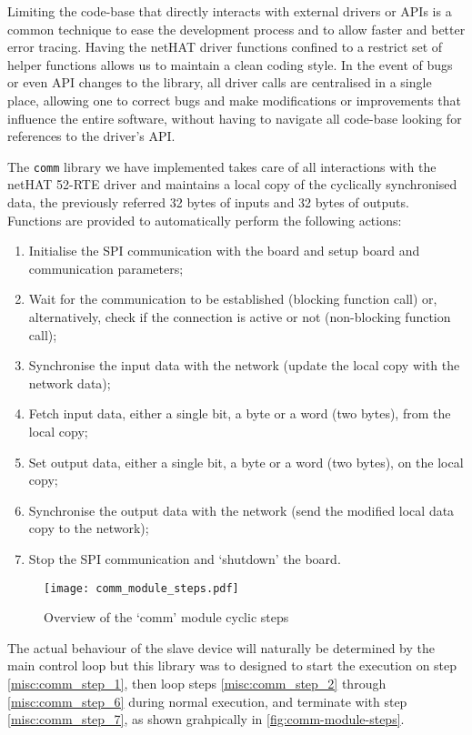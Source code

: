 Limiting the code-base that directly interacts with external drivers or APIs is a common technique to ease the development process and to allow faster and better error tracing.
Having the netHAT driver functions confined to a restrict set of helper functions allows us to maintain a clean coding style.
In the event of bugs or even API changes to the library, all driver calls are centralised in a single place, allowing one to correct bugs and make modifications or improvements that influence the entire software, without having to navigate all code-base looking for references to the driver's API.

The \verb|comm| library we have implemented takes care of all interactions with the netHAT 52-RTE driver and maintains a local copy of the cyclically synchronised data, the previously referred 32 bytes of inputs and 32 bytes of outputs.
Functions are provided to automatically perform the following actions:

\begin{enumerate}
	\item Initialise the SPI communication with the board and setup board and communication parameters; \label{misc:comm_step_1}
	\item Wait for the communication to be established (blocking function call) or, alternatively, check if the connection is active or not (non-blocking function call); \label{misc:comm_step_2}
	\item Synchronise the input data with the network (update the local copy with the network data);
	\item Fetch input data, either a single bit, a byte or a word (two bytes), from the local copy;
	\item Set output data, either a single bit, a byte or a word (two bytes), on the local copy;
	\item Synchronise the output data with the network (send the modified local data copy to the network); \label{misc:comm_step_6}
	\item Stop the SPI communication and `shutdown' the board. \label{misc:comm_step_7}
\end{enumerate}

\begin{figure}[htp]
	\centering
	\texttt{[image: comm\_module\_steps.pdf]}
	\caption{Overview of the `comm' module cyclic steps}
	\label{fig:comm-module-steps}
\end{figure}

The actual behaviour of the slave device will naturally be determined by the main control loop but this library was to designed to start the execution on step \ref{misc:comm_step_1}, then loop steps \ref{misc:comm_step_2} through \ref{misc:comm_step_6} during normal execution, and terminate with step \ref{misc:comm_step_7}, as shown grahpically in \autoref{fig:comm-module-steps}.

